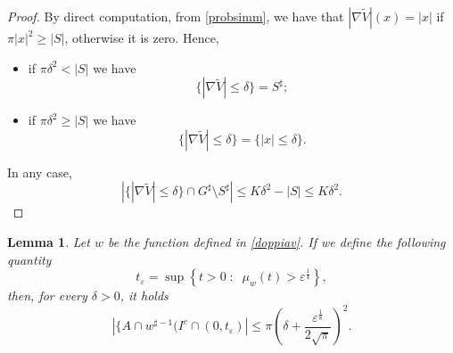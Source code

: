 \documentclass[oneside,a4paper,11pt,notitlepage]{article}
\newcommand{\abs}[1]{{\left|#1\right|}}
\theoremstyle{definition}
\theoremstyle{plain}
\newtheorem{lemma}[theorem]{Lemma}
\theoremstyle{definition}
\begin{document}
\begin{proof}
    By direct computation, from \eqref{probsimm}, we have that $\abs{\nabla \tilde V}(x)= \abs{x}$ if $\pi\abs{x}^2 \geq \abs{S}$, otherwise it is zero.  Hence,
    \begin{itemize}
        \item if $\pi\delta^2 < \abs{S}$ we have 
          \begin{equation*}
        \{\abs{\nabla \tilde V}\leq\delta\}=S^\sharp;
    \end{equation*}
      \item if $\pi\delta^2 \geq \abs{S}$ we have 
      \begin{equation*}
        \{\abs{\nabla \tilde V}\leq\delta\} = \{\abs{x}\leq\delta\}.
    \end{equation*}


    \end{itemize}
    In any case, 
      $$\abs{\{\abs{\nabla \tilde V}\leq\delta\}\cap G^\sharp\setminus S^\sharp}\leq K \delta^2 - \abs{S}\leq K \delta^2 .$$
\end{proof}
\begin{lemma} Let $w$ be the function defined in \eqref{doppiav}.
 If we define the following quantity
\begin{equation}
    \label{t_epsilon}
    t_{\varepsilon}=\sup\left\{t>0\;:\;\;\mu_w(t)>\varepsilon^{\frac{1}{4}}\right\},
\end{equation}
then, for every $\delta>0$, it holds     \begin{equation*}
        \abs{\{ A \cap w^{\sharp-1}(I^c\cap (0,t_{\varepsilon}) }\leq\pi\left(\delta+\frac{\varepsilon^{\frac18}}{2\sqrt{\pi}}\right)^2.
    \end{equation*}
\end{lemma}
\end{document}
